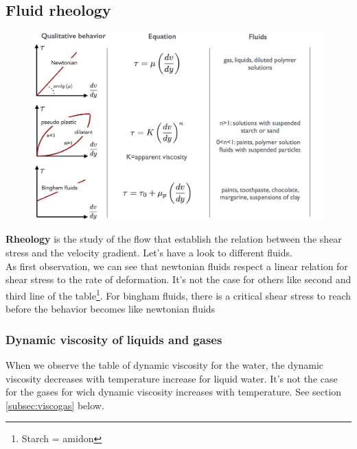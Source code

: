\subsection{Fluid rheology}
	\begin{figure}
	\vspace{-5mm}
	\includegraphics[scale=0.25]{ch1/7}
	\end{figure}
	\textbf{Rheology} is the study of the flow that establish the relation between the shear stress and the velocity gradient. Let's have a look to different fluids. \\
	As first observation, we can see that newtonian fluids respect a linear relation for shear stress to the rate of deformation. It's not the case for others like second and third line of the table\footnote{Starch = amidon}. For bingham fluids, there is a critical shear stress to reach before the behavior becomes like newtonian fluids 
	
\subsubsection{Dynamic viscosity of liquids and gases}	
	When we observe the table of dynamic viscosity for the water, the dynamic viscosity decreases with temperature increase for liquid water. It's not the case for the gases for wich dynamic viscosity increases with temperature. See section \ref{subsec:viscogas} below.
	
